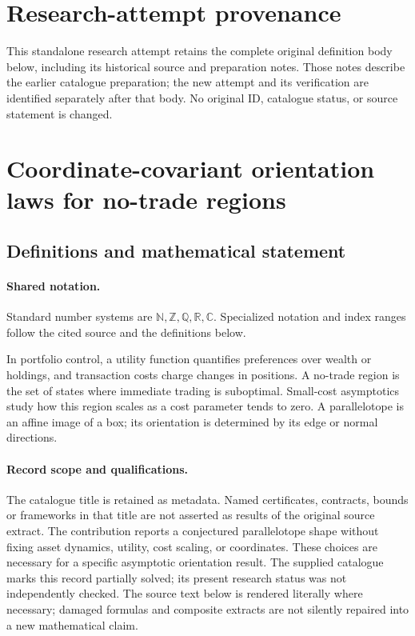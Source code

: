 \documentclass[11pt]{article}
\begin{document}
\section*{Research-attempt provenance}
This standalone research attempt retains the complete original definition body below,
including its historical source and preparation notes. Those notes describe the
earlier catalogue preparation; the new attempt and its verification are identified
separately after that body. No original ID, catalogue status, or source statement is changed.

\section{Coordinate-covariant orientation laws for no-trade regions}\label{statement}

\subsection{Definitions and mathematical statement}

\paragraph{Shared notation.}Standard number systems are $\mathbb N,\mathbb Z,\mathbb Q,\mathbb R,\mathbb C$. Specialized notation and index ranges follow the cited source and the definitions below.


In portfolio control, a utility function quantifies preferences over wealth or holdings, and transaction costs charge changes in positions. A no-trade region is the set of states where immediate trading is suboptimal. Small-cost asymptotics study how this region scales as a cost parameter tends to zero. A parallelotope is an affine image of a box; its orientation is determined by its edge or normal directions.
\paragraph{Record scope and qualifications.}
The catalogue title is retained as metadata. Named certificates, contracts, bounds or frameworks in that title are not asserted as results of the original source extract.
The contribution reports a conjectured parallelotope shape without fixing asset dynamics, utility, cost scaling, or coordinates. These choices are necessary for a specific asymptotic orientation result. The supplied catalogue marks this record partially solved; its present research status was not independently checked.
The source text below is rendered literally where necessary; damaged formulas and composite extracts are not silently repaired into a new mathematical claim.
\end{document}
